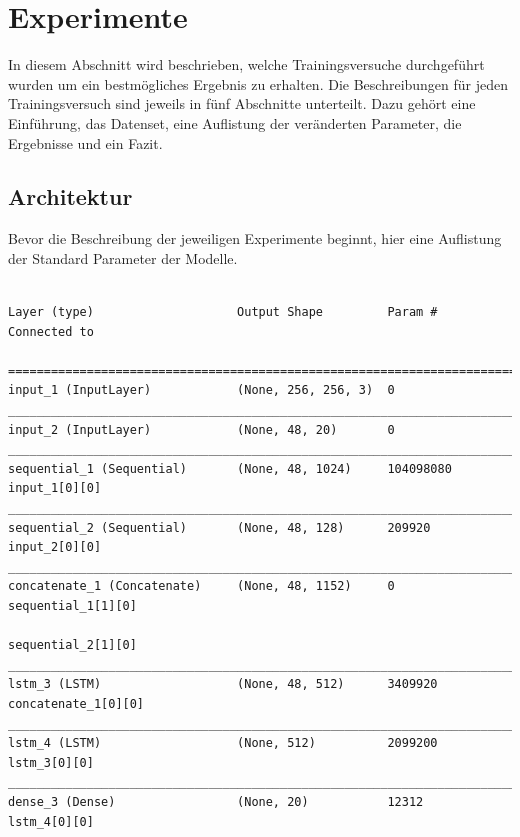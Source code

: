 \documentclass[pdftex,a4paper,halfparskip, article]{scrartcl}
\begin{document}
\newpage
\section{Experimente}\label{sec:experimente}

In diesem Abschnitt wird beschrieben, welche Trainingsversuche durchgeführt wurden um ein bestmögliches Ergebnis zu erhalten. Die Beschreibungen für jeden Trainingsversuch sind jeweils in fünf Abschnitte unterteilt. Dazu gehört eine Einführung, das Datenset, eine Auflistung der veränderten Parameter, die Ergebnisse und ein Fazit.

\subsection*{Architektur}\label{sub:architektur}
Bevor die Beschreibung der jeweiligen Experimente beginnt, hier eine Auflistung der Standard Parameter der Modelle. 

\begin{verbatim}

Layer (type)                    Output Shape         Param #     Connected to

=============================================================================
input_1 (InputLayer)            (None, 256, 256, 3)  0
_____________________________________________________________________________
input_2 (InputLayer)            (None, 48, 20)       0
_____________________________________________________________________________
sequential_1 (Sequential)       (None, 48, 1024)     104098080   input_1[0][0]
_____________________________________________________________________________
sequential_2 (Sequential)       (None, 48, 128)      209920      input_2[0][0]
_____________________________________________________________________________
concatenate_1 (Concatenate)     (None, 48, 1152)     0           sequential_1[1][0]
                                                                 sequential_2[1][0]
_____________________________________________________________________________
lstm_3 (LSTM)                   (None, 48, 512)      3409920     concatenate_1[0][0]
_____________________________________________________________________________
lstm_4 (LSTM)                   (None, 512)          2099200     lstm_3[0][0]
_____________________________________________________________________________
dense_3 (Dense)                 (None, 20)           12312       lstm_4[0][0]
\end{verbatim}
\end{document}
